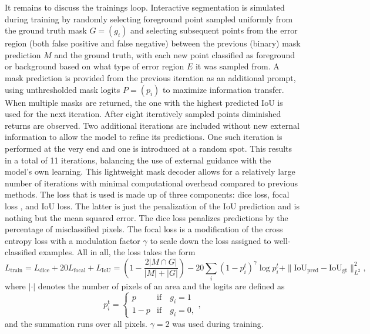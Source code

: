 It remains to discuss the trainings loop. Interactive segmentation is simulated during training by randomly selecting foreground point sampled uniformly from the ground truth mask $G = (g_{i})$ and selecting subsequent points from the error region (both false positive and false negative) between the previous (binary) mask prediction $M$  and the ground truth, with each new point classified as foreground or background based on what type of error region $E$ it was sampled from. A mask prediction is provided from the previous iteration as an additional prompt, using unthresholded mask logits $P = (p_{i})$ to maximize information transfer. When multiple masks are returned, the one with the highest predicted IoU is used for the next iteration. After eight iteratively sampled points diminished returns are observed. Two additional iterations are included without new external information to allow the model to refine its predictions. One such iteration is performed at the very end and one is introduced at a random spot. This results in a total of 11 iterations, balancing the use of external guidance with the model's own learning. This lightweight mask decoder allows for a relatively large number of iterations with minimal computational overhead compared to previous methods. The loss that is used is made up of three components: dice loss, focal loss \cite{liu2009otsu}, and IoU loss. The latter is just the penalization of the IoU prediction and is nothing but the mean squared error. The dice loss penalizes predictions by the percentage of misclassified pixels. The focal loss is a modification of the cross entropy loss with a modulation factor $\gamma$ to scale down the loss assigned to well-classified examples.  All in all, the loss takes the form
\begin{equation}\label{samloss}
	L_{\text{train}} = L_{\text{dice}} + 20L_{\text{focal}}+ L_{\text{IoU}} = \left(1 - \dfrac{2|M \cap G|}{|M| + |G|}\right) - 20\sum_{i}(1-p^t_i)^{\gamma}\log p^t_i + \|\text{IoU}_{\text{pred}} - \text{IoU}_{\text{gt}}\|_{L^2}^{2},
\end{equation}
where $|\cdot|$ denotes the number of pixels of an area and the logits are defined as
\begin{equation*}
	p_i^\text{t}=\begin{cases}p&\text{if}\quad g_i=1\\1-p&\text{if}\quad g_{i}=0,\end{cases},
\end{equation*}
and the summation runs over all pixels. $\gamma = 2$ was used during training.

